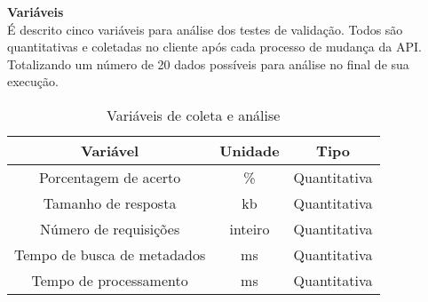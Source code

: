 



\textbf{Variáveis} \\

É descrito cinco variáveis para análise dos testes de validação. Todos são quantitativas e coletadas no cliente após cada processo de mudança da API. Totalizando um número de 20 dados possíveis para análise no final de sua execução.

\begin{table}[H]
  \centering
  \begin{tabular}{|c|c|c|}
    \hline
    Variável & Unidade & Tipo \\
    \hline
    Porcentagem de acerto & \% & Quantitativa \\
    \hline
    Tamanho de resposta & kb & Quantitativa \\
    \hline
    Número de requisições & inteiro & Quantitativa \\
    \hline
    Tempo de busca de metadados & ms & Quantitativa \\
    \hline
    Tempo de processamento & ms & Quantitativa \\
    \hline
  \end{tabular}
  \caption{Variáveis de coleta e análise}
\end{table}

 
 
 
 
 
 

 
